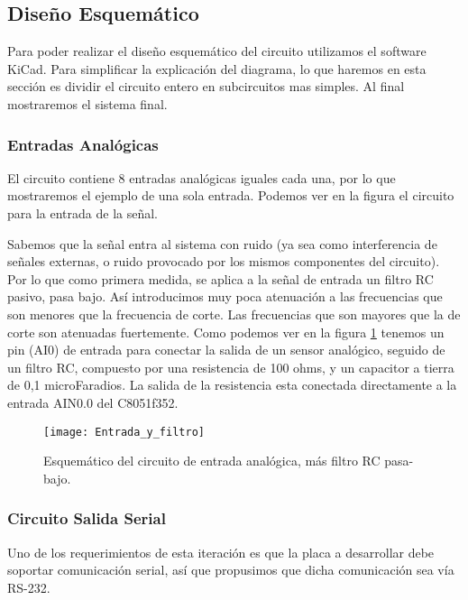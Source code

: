 \subsection{Diseño Esquemático}
\label{diseno_esquematico}

Para poder realizar el diseño esquemático del circuito utilizamos el software KiCad. Para simplificar la explicación del diagrama, lo que haremos en esta sección es dividir el circuito entero en subcircuitos mas simples. Al final mostraremos el sistema final.

\subsubsection{Entradas Analógicas}
\label{entradas_analogicas}

El circuito contiene 8 entradas analógicas iguales cada una, por lo que mostraremos el ejemplo de una sola entrada. Podemos ver en la figura  el circuito para la entrada de la señal. 

Sabemos que la señal entra al sistema con ruido (ya sea como interferencia de señales externas, o ruido provocado por los mismos componentes del circuito). Por lo que como primera medida, se aplica a la señal de entrada un filtro RC pasivo, pasa bajo. Así introducimos muy poca atenuación a las frecuencias que son menores que la frecuencia de corte. Las frecuencias que son mayores que la de corte son atenuadas fuertemente. 
Como podemos ver en la figura \ref{fig:Entrada_y_filtro} tenemos un pin (AI0) de entrada para conectar la salida de un sensor analógico, seguido de un filtro RC, compuesto por una resistencia de 100 ohms, y un capacitor a tierra de 0,1 microFaradios. La salida de la resistencia esta conectada directamente a la entrada AIN0.0 del C8051f352.

\begin{figure}[h]
  \centering
  \texttt{[image: Entrada\_y\_filtro]}
  \caption{Esquemático del circuito de entrada analógica, más filtro RC pasa-bajo.}\label{fig:Entrada_y_filtro}
\end{figure}


\subsubsection{Circuito Salida Serial}
\label{salida_serial}

Uno de los requerimientos de esta iteración es que la placa a desarrollar debe soportar comunicación serial, así que propusimos que dicha comunicación sea vía RS-232.

